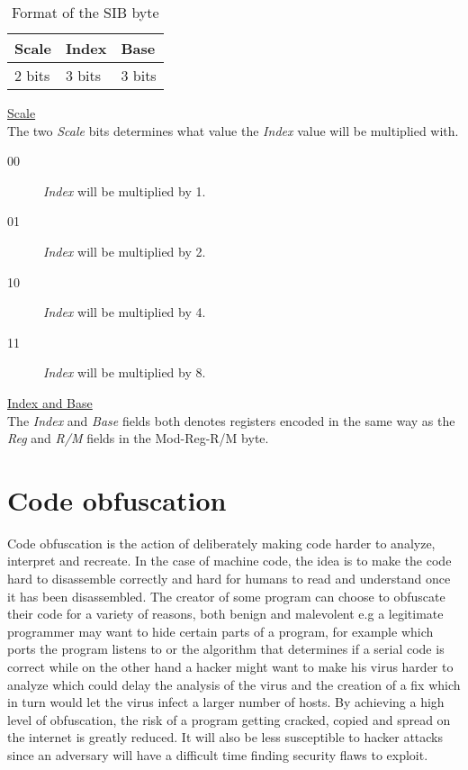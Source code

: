 \documentclass[11pt,twoside]{eitExjobb}
\begin{document}
\begin{table}[h]
\begin{tabular}{|l|l|l|}
\hline
Scale & Index & Base \\
\hline
2 bits & 3 bits & 3 bits \\
\hline
\end{tabular}
\caption{Format of the SIB byte}
\label{table:sibbyte}
\end{table}


\noindent \uline{Scale}\\
The two \emph{Scale} bits determines what value the \emph{Index} value will be multiplied with.\\
\begin{description}
\item[00] \emph{Index} will be multiplied by 1.  
\item[01] \emph{Index} will be multiplied by 2.
\item[10] \emph{Index} will be multiplied by 4.
\item[11] \emph{Index} will be multiplied by 8.
\end{description}

\noindent \uline{Index and Base}\\
The \emph{Index} and \emph{Base} fields both denotes registers encoded in the same way as the \emph{Reg} and \emph{R/M} fields in the Mod-Reg-R/M byte. \cite{bittwiddling}\cite{assemblylanguagex86}

\section{Code obfuscation}
Code obfuscation is the action of deliberately making code harder to analyze, interpret and recreate. In the case of machine code, the idea is to make the code hard to disassemble correctly and hard for humans to read and understand once it has been disassembled. The creator of some program can choose to obfuscate their code for a variety of reasons, both benign and malevolent e.g a legitimate programmer may want to hide certain parts of a program, for example which ports the program listens to or the algorithm that determines if a serial code is correct while on the other hand  a hacker might  want to make his virus harder to analyze which could delay the analysis of the virus and the creation of a fix which in turn would let the virus infect a larger number of hosts. By achieving a high level of obfuscation, the risk of a program getting cracked, copied and spread on the internet is greatly reduced. It will also be less susceptible to hacker attacks since an adversary will have a difficult time finding security flaws to exploit.
\end{document}
